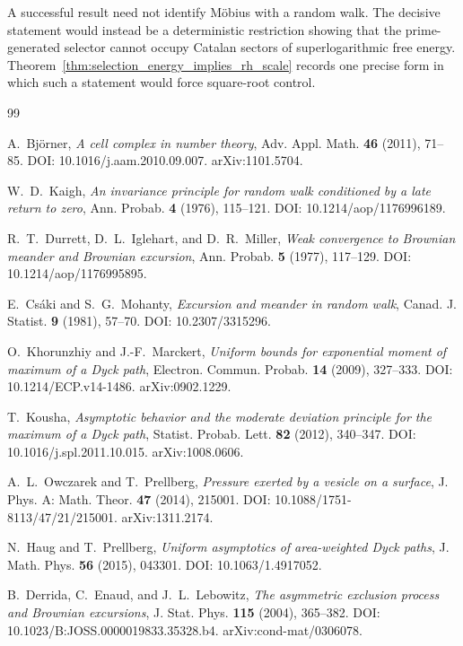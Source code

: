 \documentclass[11pt]{amsart}
\numberwithin{equation}{section}
\theoremstyle{plain}
\theoremstyle{definition}
\theoremstyle{remark}
\begin{document}
A successful result need not identify M\"obius with a random walk.  The decisive statement would instead be a deterministic restriction showing that the prime-generated selector cannot occupy Catalan sectors of superlogarithmic free energy.  Theorem~\ref{thm:selection_energy_implies_rh_scale} records one precise form in which such a statement would force square-root control.

\begin{thebibliography}{99}

A.~Bj\"orner,
\emph{A cell complex in number theory},
Adv. Appl. Math. \textbf{46} (2011), 71--85.
DOI: 10.1016/j.aam.2010.09.007.
arXiv:1101.5704.

W.~D.~Kaigh,
\emph{An invariance principle for random walk conditioned by a late return to zero},
Ann. Probab. \textbf{4} (1976), 115--121.
DOI: 10.1214/aop/1176996189.

R.~T.~Durrett, D.~L.~Iglehart, and D.~R.~Miller,
\emph{Weak convergence to Brownian meander and Brownian excursion},
Ann. Probab. \textbf{5} (1977), 117--129.
DOI: 10.1214/aop/1176995895.

E.~Cs\'aki and S.~G.~Mohanty,
\emph{Excursion and meander in random walk},
Canad. J. Statist. \textbf{9} (1981), 57--70.
DOI: 10.2307/3315296.

O.~Khorunzhiy and J.-F.~Marckert,
\emph{Uniform bounds for exponential moment of maximum of a Dyck path},
Electron. Commun. Probab. \textbf{14} (2009), 327--333.
DOI: 10.1214/ECP.v14-1486.
arXiv:0902.1229.

T.~Kousha,
\emph{Asymptotic behavior and the moderate deviation principle for the maximum of a Dyck path},
Statist. Probab. Lett. \textbf{82} (2012), 340--347.
DOI: 10.1016/j.spl.2011.10.015.
arXiv:1008.0606.

A.~L.~Owczarek and T.~Prellberg,
\emph{Pressure exerted by a vesicle on a surface},
J. Phys. A: Math. Theor. \textbf{47} (2014), 215001.
DOI: 10.1088/1751-8113/47/21/215001.
arXiv:1311.2174.

N.~Haug and T.~Prellberg,
\emph{Uniform asymptotics of area-weighted Dyck paths},
J. Math. Phys. \textbf{56} (2015), 043301.
DOI: 10.1063/1.4917052.

B.~Derrida, C.~Enaud, and J.~L.~Lebowitz,
\emph{The asymmetric exclusion process and Brownian excursions},
J. Stat. Phys. \textbf{115} (2004), 365--382.
DOI: 10.1023/B:JOSS.0000019833.35328.b4.
arXiv:cond-mat/0306078.


\end{thebibliography}
\end{document}
